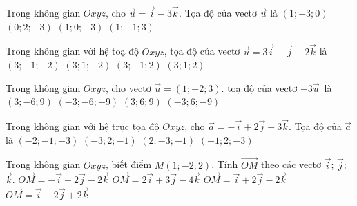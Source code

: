 \begin{ex}%
	Trong không gian $Oxyz$, cho $\overrightarrow{u}=\overrightarrow{i}-3\overrightarrow{k}$.  Tọa độ của vectơ $\overrightarrow{u}$ là
	 \choice
		{$(1;-3;  0)$}
		{$(0;  2;-3)$}
		 {\True $(1; 0;-3)$}
		{$(1;-1; 3)$} 
\end{ex}

\begin{ex}%
	Trong không gian với hệ  toạ độ $Oxyz$, tọa độ của vectơ $\overrightarrow{u}=3 \overrightarrow{i}-\overrightarrow{j}-2 \overrightarrow{k}$ là
	 \choice
		 {\True $(3;-1;-2)$}
		 {$(3;1;-2)$}
		 {$(3;-1;2)$}
		{$(3;1;2)$} 
\end{ex}

\begin{ex}%
	Trong không gian $Oxyz$, cho vectơ $\overrightarrow{u}=(1;-2;3)$.  toạ độ của vectơ $-3\overrightarrow{u}$~là
	 \choice
		 {$(3;-6;9)$}
		{$(-3;-6;-9)$} 
		 {$(3;6;9)$}
		{\True $(-3;6;-9)$} 
\end{ex}

\begin{ex}%
	Trong không gian với hệ trục  tọa độ $Oxyz$, cho $\overrightarrow{a}=-\overrightarrow{i}+2\overrightarrow{j}-3\overrightarrow{k}$. Tọa độ của $\overrightarrow{a}$ là
	\choice 
		{$(-2;-1;-3)$} 
		 {$(-3;2;-1)$}
		{$(2;-3;-1)$} 
		{\True $(-1;2;-3)$} 
\end{ex}

\begin{ex}%
	Trong không gian $Oxyz$,  biết điểm $M(1;-2; 2)$. Tính $\overrightarrow{OM}$ theo các vectơ $\overrightarrow{i}$; $\overrightarrow{j}$; $\overrightarrow{k}$.
	\choice 
		{$\overrightarrow{OM}=-\overrightarrow{i} +2\overrightarrow{j}  -2\overrightarrow{k}$}
		 {$\overrightarrow{OM}= 2\overrightarrow{i} +3\overrightarrow{j} -4\overrightarrow{k}$}
		{$\overrightarrow{OM}=\overrightarrow{i} +2\overrightarrow{j} -2\overrightarrow{k}$} 
		{\True $\overrightarrow{OM}=\overrightarrow{i} -2\overrightarrow{j} +2\overrightarrow{k}$} 
\end{ex}

